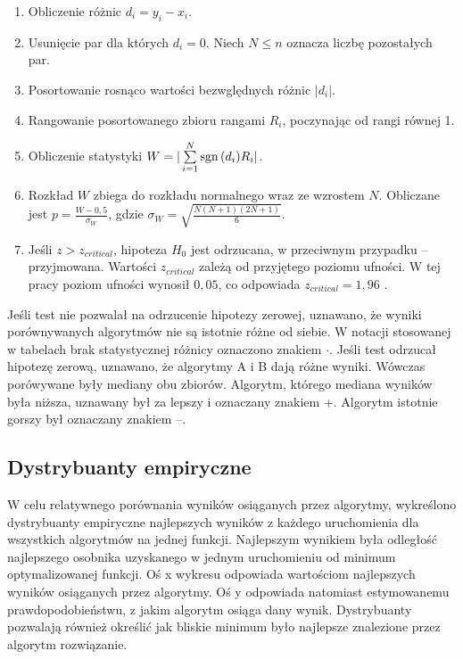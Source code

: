 \documentclass[a4paper,onecolumn,oneside,11pt,wide,floatssmall]{mwrep}
\def\sgn{{\rm sgn}\,}
\theoremstyle{definition}
\theoremstyle{plain}%
\theoremstyle{remark}
\begin{document}
\begin{enumerate}
 \item Obliczenie różnic $d_i = y_i - x_i$.
 \item Usunięcie par dla których $d_i = 0$. Niech $N \leq n$ oznacza liczbę pozostałych par.
 \item Posortowanie rosnąco wartości bezwględnych różnic $|d_i|$.
 \item Rangowanie posortowanego zbioru rangami $R_i$, poczynając od rangi równej 1. 
 \item Obliczenie statystyki $W = |\sum\limits_{i=1}^{N} \sgn(d_i)R_i|$.
 \item Rozkład $W$ zbiega do rozkładu normalnego wraz ze wzrostem $N$. Obliczane jest
 $p = \frac{W - 0,5}{\sigma_W}$, gdzie $\sigma_W = \sqrt{\frac{N(N+1)(2N+1)}{6}}.$ 
 \item Jeśli $z > z_{critical}$, hipoteza $H_0$ jest odrzucana, w przeciwnym przypadku -- przyjmowana. 
Wartości $z_{critical}$ zależą od przyjętego poziomu ufności. 
W tej pracy poziom ufności wynosił $0,05$, co odpowiada $z_{critical}=1,96$ \cite{lowry}.  
\end{enumerate}

Jeśli test nie pozwalał na odrzucenie hipotezy zerowej, uznawano, że wyniki porównywanych algorytmów
nie są istotnie różne od siebie. W notacji stosowanej w tabelach brak statystycznej różnicy oznaczono
znakiem $\cdotp$.
Jeśli test odrzucał hipotezę zerową, uznawano, że algorytmy A i B dają różne wyniki.
Wówczas porówywane były mediany obu zbiorów. Algorytm, którego mediana wyników była niższa,
uznawany był za lepszy i oznaczany znakiem +. Algorytm istotnie gorszy był oznaczany znakiem --.

\subsection{Dystrybuanty empiryczne}

W celu relatywnego porównania wyników osiąganych przez algorytmy, 
wykreślono dystrybuanty empiryczne najlepszych wyników z każdego uruchomienia 
dla wszystkich algorytmów na jednej funkcji. Najlepszym wynikiem była odległość najlepszego 
osobnika uzyskanego w jednym uruchomieniu od minimum optymalizowanej funkcji. Oś x wykresu
odpowiada wartościom najlepszych wyników osiąganych przez algorytmy. Oś y odpowiada natomiast 
estymowanemu prawdopodobieństwu, z jakim algorytm osiąga dany wynik. Dystrybuanty pozwalają również
określić jak bliskie minimum było najlepsze znalezione przez algorytm rozwiązanie.
\end{document}
